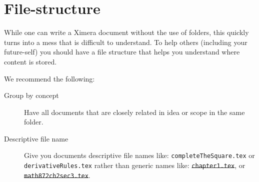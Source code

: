 \documentclass{ximera}
\begin{document}
\section{File-structure}

While one can write a Ximera document without the use of folders, this quickly
turns into a mess that is difficult to understand.
To help others (including your future-self) you should have a file structure
that helps you understand where content is stored.

We recommend the following:
\begin{description}
  \item[Group by concept] Have all documents that are closely related in idea
    or
    scope in the same folder.
  \item[Descriptive file name] Give you documents descriptive file names like:
    \verb!completeTheSquare.tex! or \verb!derivativeRules.tex! rather than
    generic
    names like: \sout{\texttt{chapter1.tex}}, or
    \sout{\texttt{math872ch2sec3.tex}}.
\end{description}
\end{document}
